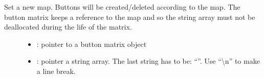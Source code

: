 \documentclass[letterpaper,10pt,english]{sphinxmanual}
\begin{document}

\begin{fulllineitems}
\label{\detokenize{object-types/btnm:_CPPv415lv_btnm_set_mapPK8lv_obj_tA_PKc}}%
\pysigstartmultiline
{}\label{\detokenize{object-types/btnm:lv__btnm_8h_1aec4554ea1f5f349fb4940962fbfd96ca}}%
\pysigstopmultiline
Set a new map. Buttons will be created/deleted according to the map. The button matrix keeps a reference to the map and so the string array must not be deallocated during the life of the matrix. \begin{description}
\item[{}] \leavevmode\begin{itemize}
\item {} 
: pointer to a button matrix object 

\item {} 
: pointer a string array. The last string has to be: “”. Use “\textbackslash{}n” to make a line break. 

\end{itemize}

\end{description}


\end{fulllineitems}

\end{document}
